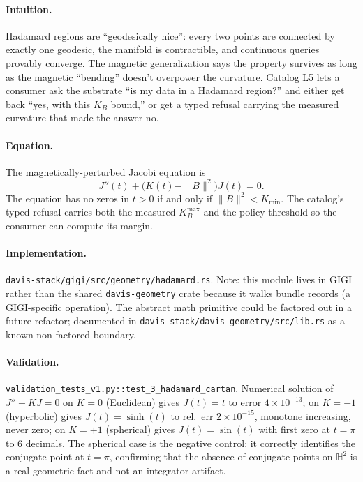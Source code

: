 \documentclass[11pt,letterpaper]{article}
\begin{document}
\paragraph{Intuition.}
Hadamard regions are ``geodesically nice'': every two points are
connected by exactly one geodesic, the manifold is contractible,
and continuous queries provably converge. The magnetic
generalization says the property survives as long as the magnetic
``bending'' doesn't overpower the curvature. Catalog L5 lets a
consumer ask the substrate ``is my data in a Hadamard region?''
and either get back ``yes, with this $K_B$ bound,'' or get a typed
refusal carrying the measured curvature that made the answer no.

\paragraph{Equation.}
The magnetically-perturbed Jacobi equation is
\[
J''(t) + \bigl( K(t) - \|B\|^2 \bigr) J(t) = 0.
\]
The equation has no zeros in $t > 0$ if and only if $\|B\|^2 <
K_{\min}$. The catalog's typed refusal carries both the measured
$K_B^{\max}$ and the policy threshold so the consumer can compute
its margin.

\paragraph{Implementation.}
\texttt{davis-stack/gigi/src/geometry/hadamard.rs}. Note: this
module lives in GIGI rather than the shared \texttt{davis-geometry}
crate because it walks bundle records (a GIGI-specific operation).
The abstract math primitive could be factored out in a future
refactor; documented in
\texttt{davis-stack/davis-geometry/src/lib.rs} as a known
non-factored boundary.

\paragraph{Validation.}
\texttt{validation\_tests\_v1.py::test\_3\_hadamard\_cartan}.
Numerical solution of $J'' + KJ = 0$ on
$K = 0$ (Euclidean) gives $J(t) = t$ to error $4 \times 10^{-13}$;
on $K = -1$ (hyperbolic) gives $J(t) = \sinh(t)$ to rel.\ err
$2 \times 10^{-15}$, monotone increasing, never zero; on $K = +1$
(spherical) gives $J(t) = \sin(t)$ with first zero at $t = \pi$ to
6 decimals. The spherical case is the negative control: it
correctly identifies the conjugate point at $t = \pi$, confirming
that the absence of conjugate points on $\mathbb{H}^2$ is a real
geometric fact and not an integrator artifact.
\end{document}
